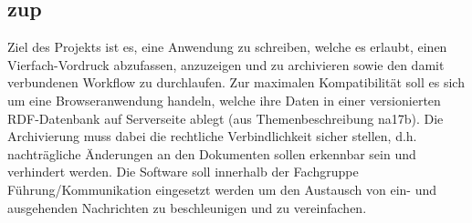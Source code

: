 \subsection{zup}
Ziel des Projekts ist es, eine Anwendung zu schreiben, welche es erlaubt, einen Vierfach-Vordruck
abzufassen, anzuzeigen und zu archivieren sowie den damit verbundenen Workflow zu durchlaufen. 
Zur maximalen Kompatibilität soll es sich um eine Browseranwendung handeln, welche ihre Daten in
einer versionierten RDF-Datenbank auf Serverseite ablegt (aus Themenbeschreibung na17b). 
Die Archivierung muss dabei die rechtliche Verbindlichkeit sicher stellen, d.h. nachträgliche
Änderungen an den Dokumenten sollen erkennbar sein und verhindert werden.
Die Software soll innerhalb der Fachgruppe Führung/Kommunikation eingesetzt werden um den Austausch 
von ein- und ausgehenden Nachrichten zu beschleunigen und zu vereinfachen.
